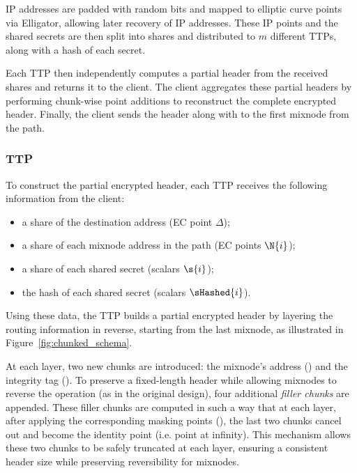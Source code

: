 IP addresses are padded with random bits and mapped to elliptic curve points via Elligator, allowing later recovery of IP addresses.
These IP points and the shared secrets are then split into shares and distributed to $m$ different TTPs, along with a hash of each secret. %

Each TTP then independently computes a partial header from the received shares and returns it to the client. 
The client aggregates these partial headers by performing chunk-wise point additions to reconstruct the complete encrypted header.
Finally, the client sends the header along with  to the first mixnode from the path. 

\subsubsection{TTP}

To construct the partial encrypted header, each TTP receives the following information from the client:
\begin{itemize}
    \item a share of the destination address (EC point $ \Delta $);
    \item a share of each mixnode address in the path (EC points $ \N{i} $);
    \item a share of each shared secret (scalars $ \s{i} $);
    \item the hash of each shared secret (scalars $ \sHashed{i} $).
\end{itemize}

Using these data, the TTP builds a partial encrypted header by layering the routing information in reverse, starting from the last mixnode, as illustrated in Figure~\ref{fig:chunked_schema}.

At each layer, two new chunks are introduced: the mixnode's address () and the integrity tag ().  
To preserve a fixed-length header while allowing mixnodes to reverse the operation (as in the original design), four additional \emph{filler chunks} are appended.  
These filler chunks are computed in such a way that at each layer, after applying the corresponding masking points (\hspace{-1mm}), the last two chunks cancel out and become the identity point (i.e. point at infinity).  
This mechanism allows these two chunks to be safely truncated at each layer, ensuring a consistent header size while preserving reversibility for mixnodes.

